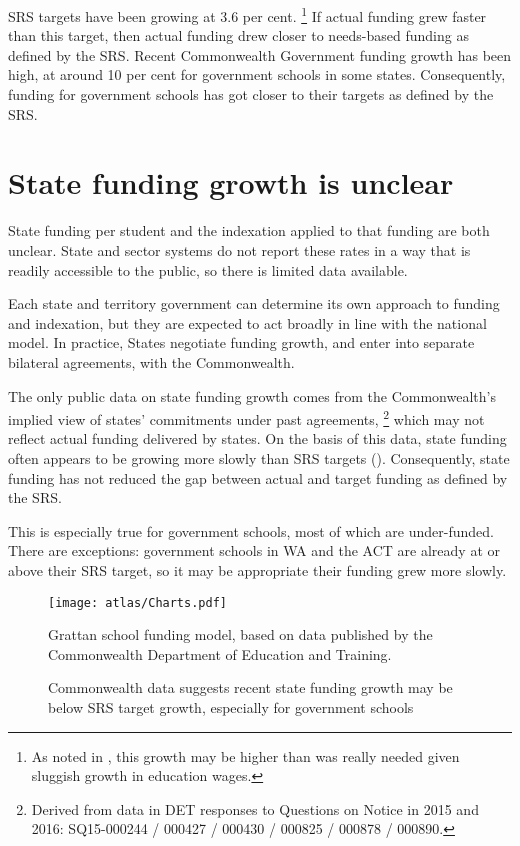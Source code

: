 \documentclass{grattan}
\begin{document}
SRS targets have been growing at 3.6 per cent.%
\footnote{As noted in , this growth may be higher than was really needed given sluggish growth in education wages.}
If actual funding grew faster than this target, then actual funding drew closer to needs-based funding as defined by the SRS\@.
Recent Commonwealth Government funding growth has been high, at around 10 per cent for government schools in some states.
Consequently, funding for government schools has got closer to their targets as defined by the SRS.

\section{State funding growth is unclear}\label{sec:state-funding-growth-is-unclear}

State funding per student and the indexation applied to that funding are both unclear. State and sector systems do not report these rates in a way that is readily accessible to the public, so there is limited data available.

Each state and territory government can determine its own approach to funding and indexation, but they are expected to act broadly in line with the national model. In practice, States negotiate funding growth, and enter into separate bilateral agreements, with the Commonwealth.

The only public data on state funding growth comes from the Commonwealth's implied view of states' commitments under past agreements,%
\footnote{Derived from data in DET responses to Questions on Notice in 2015 and 2016: SQ15-000244 / 000427 / 000430 / 000825 / 000878 / 000890.}
which may not reflect actual funding delivered by states.
On the basis of this data, state funding often appears to be growing more slowly than SRS targets ().
Consequently, state funding has not reduced the gap between actual and target funding as defined by the SRS\@.

This is especially true for government schools, most of which are under-funded.
There are exceptions:
government schools in WA and the ACT are already at or above their SRS target, so it may be appropriate their funding grew more slowly.

\begin{figure}
\caption{Commonwealth data suggests recent state funding growth may be below SRS target growth, especially for government schools}\label{fig:State-govt-funding-growth-below-SRS-target-growth}

\texttt{[image: atlas/Charts.pdf]}

%
{Grattan school funding model, based on data published by the Commonwealth Department of Education and Training.}
\end{figure}
\end{document}
